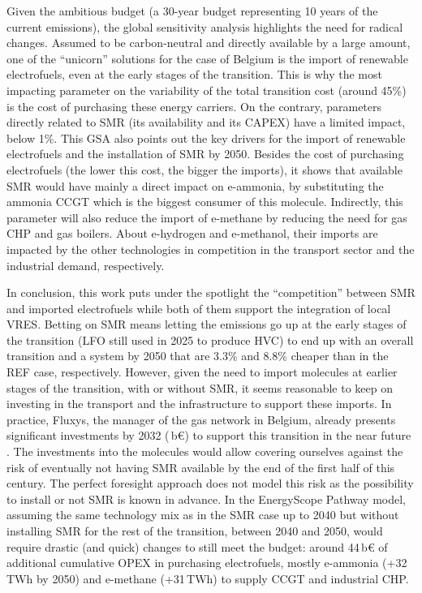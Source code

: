 Given the ambitious  budget (\ie a 30-year budget representing 10 years of the current emissions), the global sensitivity analysis highlights the need for radical changes. Assumed to be carbon-neutral and directly available by a large amount, one of the ``unicorn'' solutions for the case of Belgium is the import of renewable electrofuels, even at the early stages of the transition. This is why the most impacting parameter on the variability of the total transition cost (around 45\%) is the cost of purchasing these energy carriers. On the contrary, parameters directly related to \gls{SMR} (\ie its availability and its CAPEX) have a limited impact, below 1\%. This \gls{GSA} also points out the key drivers for the import of renewable electrofuels and the installation of \gls{SMR} by 2050. Besides the cost of purchasing electrofuels (\ie the lower this cost, the bigger the imports), it shows that available \gls{SMR} would have mainly a direct impact on e-ammonia, by substituting the ammonia \gls{CCGT} which is the biggest consumer of this molecule. Indirectly, this parameter will also reduce the import of e-methane by reducing the need for gas \gls{CHP} and gas boilers. About e-hydrogen and e-methanol, their imports are impacted by the other technologies in competition in the transport sector and the industrial demand, respectively.

In conclusion, this work puts under the spotlight the ``competition'' between \gls{SMR} and imported electrofuels while both of them support the integration of local \gls{VRES}. Betting on \gls{SMR} means letting the emissions go up at the early stages of the transition (\ie \gls{LFO} still used in 2025 to produce \gls{HVC}) to end up with an overall transition and a system by 2050 that are 3.3\% and 8.8\% cheaper than in the REF case, respectively. However, given the need to import molecules at earlier stages of the transition, with or without \gls{SMR}, it seems reasonable to keep on investing in the transport and the infrastructure to support these imports. In practice, Fluxys, the manager of the gas network in Belgium, already presents significant investments by 2032 (\,b€) to support this transition in the near future \cite{Fluxys_2023}. The investments into the molecules would allow covering ourselves against the risk of eventually not having \gls{SMR} available by the end of the first half of this century. The perfect foresight approach does not model this risk as the possibility to install or not \gls{SMR} is known in advance. In the EnergyScope Pathway model, assuming the same technology mix as in the SMR case up to 2040 but without installing \gls{SMR} for the rest of the transition, \ie between 2040 and 2050, would require drastic (and quick) changes to still meet the  budget: around 44\,b€ of additional cumulative OPEX in purchasing electrofuels, mostly e-ammonia (+32\,TWh by 2050) and e-methane (+31\,TWh) to supply \gls{CCGT} and industrial \gls{CHP}. 
%
